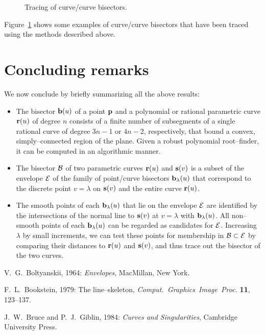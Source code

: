 {{\begin{figure}[htbp] \vspace{6cm}
\caption[]{Tracing of curve/curve bisectors.}
\label{fig:etrace} \end{figure}

Figure~\ref{fig:etrace} shows some examples of curve/curve
bisectors that have been traced using the methods described
above.

\section{Concluding remarks}

We now conclude by briefly summarizing all the above results:
\begin{itemize}
\item
The bisector ${\bf b}(u)$ of a point ${\bf p}$ and a polynomial
or rational parametric curve ${\bf r}(u)$ of degree $n$ consists
of a finite number of subsegments of a single rational curve
of degree $3n-1$ or $4n-2$, respectively, that bound a convex,
simply--connected region of the plane. Given a robust polynomial
root--finder, it can be computed in an algorithmic manner.
\item
The bisector ${\cal B}$ of two parametric curves ${\bf r}(u)$
and ${\bf s}(v)$ is a subset of the envelope ${\cal E}$ of
the family of point/curve bisectors ${\bf b}_\lambda(u)$ that
correspond to the discrete point $v=\lambda$ on ${\bf s}(v)$
and the entire curve ${\bf r}(u)$.
\item
The smooth points of each ${\bf b}_\lambda(u)$ that lie on
the envelope ${\cal E}$ are identified by the intersections of
the normal line to ${\bf s}(v)$ at $v=\lambda$ with ${\bf b}_
\lambda(u)$. All non--smooth points of each ${\bf b}_\lambda
(u)$ can be regarded as candidates for ${\cal E}$. Increasing
$\lambda$ by small increments, we can test these points for
membership in ${\cal B}\subset{\cal E}$ by comparing their
distances to ${\bf r}(u)$ and ${\bf s}(v)$, and thus trace
out the bisector of the two curves.
\end{itemize}

\begin{thebibliography}{99}

V.~G.~Boltyanskii, 1964: {\it Envelopes}, MacMillan, New York.

F.~L.~Bookstein, 1979: The line--skeleton, {\it Comput.\ Graphics\
Image\ Proc.} {\bf 11}, 123--137.

J.~W.~Bruce and P.~J.~Giblin, 1984: {\em Curves and Singularities},
Cambridge University Press.


\end{thebibliography}}}
